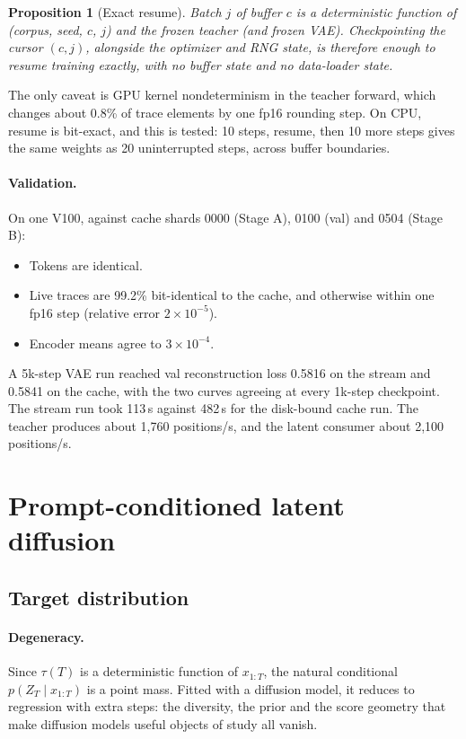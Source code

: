 \documentclass[11pt]{article}
\newtheorem{proposition}{Proposition}
\begin{document}
\begin{proposition}[Exact resume]
Batch $j$ of buffer $c$ is a deterministic function of (corpus, seed, $c$, $j$) and the frozen teacher (and frozen VAE).
Checkpointing the cursor $(c, j)$, alongside the optimizer and RNG state, is therefore enough to resume training exactly, with no buffer state and no data-loader
state.
\end{proposition}
\noindent The only caveat is GPU kernel nondeterminism in the teacher forward, which changes about 0.8\% of trace elements
by one fp16 rounding step. On CPU, resume is bit-exact, and this is tested: 10 steps, resume, then 10 more steps gives
the same weights as 20 uninterrupted steps, across buffer boundaries.

\paragraph{Validation.} On one V100, against cache shards 0000 (Stage A), 0100 (val) and 0504 (Stage B):
\begin{itemize}[leftmargin=1.5em]
  \item Tokens are identical.
  \item Live traces are 99.2\% bit-identical to the cache, and otherwise within one fp16 step (relative error $2\times10^{-5}$).
  \item Encoder means agree to $3\times10^{-4}$.
\end{itemize}
A 5k-step VAE run reached val reconstruction loss 0.5816 on the stream and 0.5841 on the cache, with the two curves
agreeing at every 1k-step checkpoint. The stream run took 113\,s against 482\,s for the disk-bound cache run. The
teacher produces about 1{,}760 positions/s, and the latent consumer about 2{,}100 positions/s.

\section{Prompt-conditioned latent diffusion}
\label{sec:ldm}

\subsection{Target distribution}

\paragraph{Degeneracy.} Since $\tau(T)$ is a deterministic function of $x_{1:T}$, the natural conditional
$p(Z_T\mid x_{1:T})$ is a point mass. Fitted with a diffusion model, it reduces to regression with extra steps: the
diversity, the prior and the score geometry that make diffusion models useful objects of study all vanish.
\end{document}
